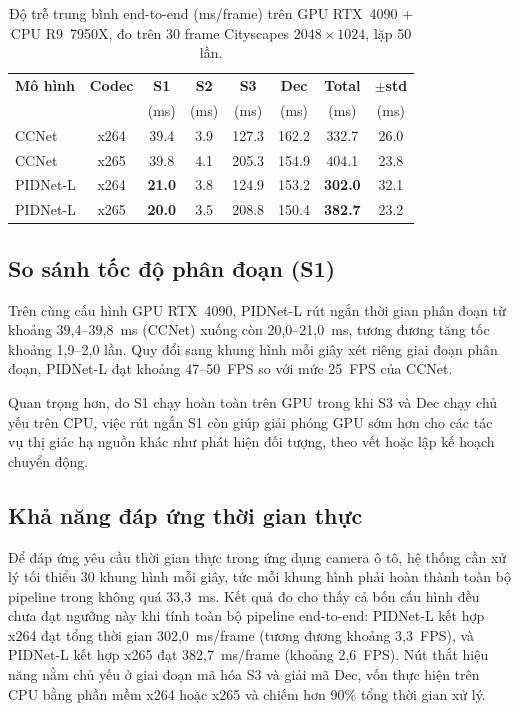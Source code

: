 \begin{table}[H]
\centering
\caption{Độ trễ trung bình end-to-end (ms/frame) trên GPU RTX~4090 + CPU R9~7950X, đo trên 30 frame Cityscapes $2048\times1024$, lặp 50 lần.}
\label{tab:e2e-latency}
\small
\begin{tabular}{p{}ccccccc}
\toprule
\textbf{Mô hình} & \textbf{Codec} & \textbf{S1} & \textbf{S2} & \textbf{S3} & \textbf{Dec} & \textbf{Total} & $\boldsymbol{\pm}$\textbf{std} \\
 & & (ms) & (ms) & (ms) & (ms) & (ms) & (ms) \\
\midrule
CCNet & x264 & 39.4 & 3.9 & 127.3 & 162.2 & 332.7 & 26.0 \\
CCNet & x265 & 39.8 & 4.1 & 205.3 & 154.9 & 404.1 & 23.8 \\
PIDNet-L & x264 & \textbf{21.0} & 3.8 & 124.9 & 153.2 & \textbf{302.0} & 32.1 \\
PIDNet-L & x265 & \textbf{20.0} & 3.5 & 208.8 & 150.4 & \textbf{382.7} & 23.2 \\
\bottomrule
\end{tabular}
\end{table}

\subsection{So sánh tốc độ phân đoạn (S1)}

Trên cùng cấu hình GPU RTX~4090, PIDNet-L rút ngắn thời gian phân đoạn từ khoảng 39,4--39,8~ms (CCNet) xuống còn 20,0--21,0~ms, tương đương tăng tốc khoảng 1,9--2,0 lần. Quy đổi sang khung hình mỗi giây xét riêng giai đoạn phân đoạn, PIDNet-L đạt khoảng 47--50~FPS so với mức 25~FPS của CCNet.

Quan trọng hơn, do S1 chạy hoàn toàn trên GPU trong khi S3 và Dec chạy chủ yếu trên CPU, việc rút ngắn S1 còn giúp giải phóng GPU sớm hơn cho các tác vụ thị giác hạ nguồn khác như phát hiện đối tượng, theo vết hoặc lập kế hoạch chuyển động.

\subsection{Khả năng đáp ứng thời gian thực}

Để đáp ứng yêu cầu thời gian thực trong ứng dụng camera ô tô, hệ thống cần xử lý tối thiểu 30 khung hình mỗi giây, tức mỗi khung hình phải hoàn thành toàn bộ pipeline trong không quá 33,3~ms. Kết quả đo cho thấy cả bốn cấu hình đều chưa đạt ngưỡng này khi tính toàn bộ pipeline end-to-end: PIDNet-L kết hợp x264 đạt tổng thời gian 302,0~ms/frame (tương đương khoảng 3,3~FPS), và PIDNet-L kết hợp x265 đạt 382,7~ms/frame (khoảng 2,6~FPS). Nút thắt hiệu năng nằm chủ yếu ở giai đoạn mã hóa S3 và giải mã Dec, vốn thực hiện trên CPU bằng phần mềm x264 hoặc x265 và chiếm hơn 90\% tổng thời gian xử lý.

